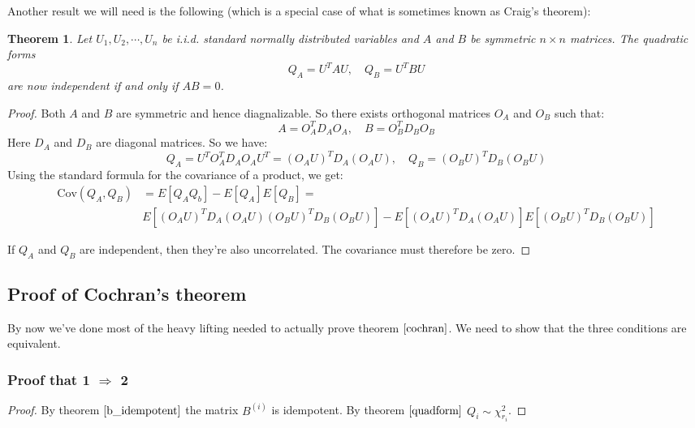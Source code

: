 \documentclass[12pt, a4paper]{article}
\newtheorem{theorem}{Theorem}
\begin{document}
Another result we will need is the following (which is a special case of what is sometimes known as Craig's theorem):
\begin{theorem}
\label{craig}
Let $U_1, U_2,\cdots,U_n$ be i.i.d. standard normally distributed variables and $A$ and $B$ be symmetric $n\times n$ matrices. The quadratic forms
\begin{equation}
Q_A=U^TAU,\quad Q_B=U^TBU
\end{equation}
are now independent if and only if $AB=0$.
\end{theorem}
\begin{proof}
Both $A$ and $B$ are symmetric and hence diagnalizable. So there exists orthogonal matrices $O_A$ and $O_B$ such that:
\begin{equation}
A=O_A^T D_A O_A,\quad B=O_B^T D_B O_B
\end{equation}
Here $D_A$ and $D_B$ are diagonal matrices. So we have:
\begin{equation}
Q_A=U^T O_A^T D_A O_A U^T = (O_A U)^T D_A (O_A U),\quad Q_B=(O_B U)^T D_B (O_B U)
\end{equation}
Using the standard formula for the covariance of a product, we get:
\begin{align*}
\textrm{Cov}(Q_A,Q_B) & =E[Q_AQ_b]-E[Q_A]E[Q_B]=\\
& E[(O_A U)^T D_A (O_A U)(O_B U)^T D_B (O_B U)]-E[(O_A U)^T D_A (O_A U)]E[(O_B U)^T D_B (O_B U)]
\end{align*}


If $Q_A$ and $Q_B$ are independent, then they're also uncorrelated. The covariance must therefore be zero. 
\end{proof}

\subsection{Proof of Cochran's theorem}
By now we've done most of the heavy lifting needed to actually prove theorem $\ref{cochran}$. We need to show that the three conditions are equivalent.

\subsubsection{Proof that 1 $\Rightarrow$ 2}
\begin{proof}
By theorem $\ref{b_idempotent}$ the matrix $B^{(i)}$ is idempotent. By theorem $\ref{quadform}$ $Q_i\sim\chi^2_{r_i}$.
\end{proof}
\end{document}
